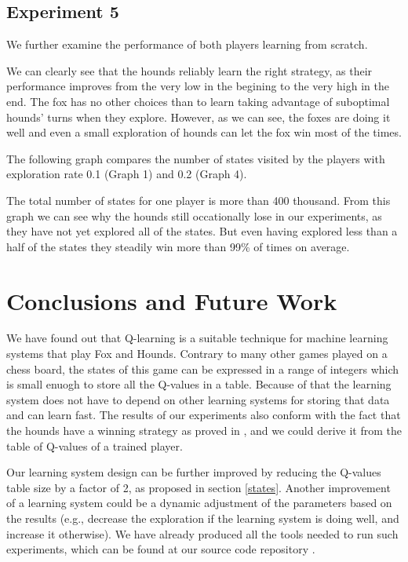 \documentclass[a4paper]{article}
\begin{document}
\subsection{Experiment 5}
We further examine the performance of both players learning from scratch.









We can clearly see that the hounds reliably learn the right strategy, as their
performance improves from the very low in the begining to the very high in the
end. The fox has no other choices than to learn taking advantage of suboptimal
hounds' turns when they explore. However, as we can see, the foxes are doing it
well and even a small exploration of hounds can let the fox win most of the
times.

The following graph compares the number of states visited by the players with
exploration rate 0.1 (Graph 1) and 0.2 (Graph 4).



The total number of states for one player is more than 400 thousand. From this
graph we can see why the hounds still occationally lose in our experiments, as
they have not yet explored all of the states. But even having explored less
than a half of the states they steadily win more than 99\% of times on average.

\section{Conclusions and Future Work}
We have found out that Q-learning is a suitable technique for machine learning
systems that play Fox and Hounds. Contrary to many other games played on a chess
board, the states of this game can be expressed in a range of integers which is
small enuogh to store all the Q-values in a table. Because of that the learning
system does not have to depend on other learning systems for storing that data
and can learn fast. The results of our experiments also conform with the fact
that the hounds have a winning strategy as proved in \cite{berlekamp82}, and we
could derive it from the table of Q-values of a trained player.

Our learning system design can be further improved by reducing the Q-values
table size by a factor of 2, as proposed in section \ref{states}. Another
improvement of a learning system could be a dynamic adjustment of the
parameters based on the results (e.g., decrease the exploration if the
learning system is doing well, and increase it otherwise). We have already
produced all the tools needed to run such experiments, which can be found at
our source code repository \cite{github}.
\end{document}

